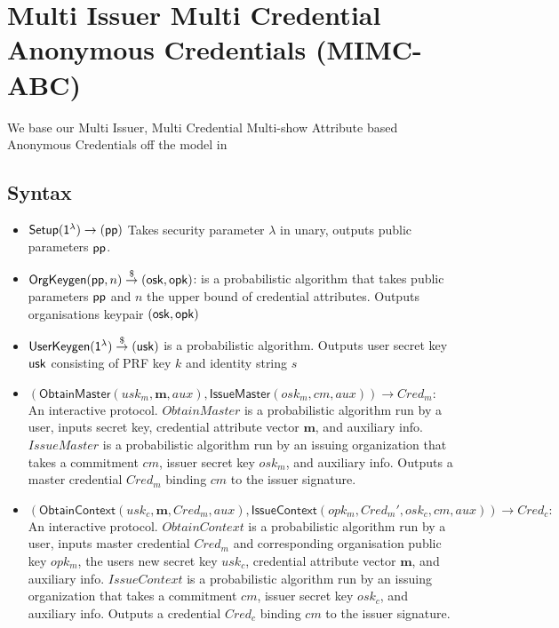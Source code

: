 \cleardoublepage
\section{Multi Issuer Multi Credential Anonymous Credentials (MIMC-ABC)}\label{sec:mimc}

We base our Multi Issuer, Multi Credential Multi-show Attribute based Anonymous Credentials off the model in \cite{fuchsbauer_structure-preserving_2019}


\subsection{Syntax}
\begin{itemize}
    \item $\mathsf{Setup}(\mathsf{1^{\lambda}}) \to (\mathsf{pp})$ Takes security parameter $\lambda$ in unary, outputs public parameters $\mathsf{pp}$.

    \item $\mathsf{OrgKeygen}(\mathsf{pp}, n) \stackrel{\$}{\to} (\mathsf{osk}, \mathsf{opk})$: is a probabilistic algorithm that takes public parameters $\mathsf{pp}$ and $n$ the upper bound of credential attributes. Outputs organisations keypair $(\mathsf{osk}, \mathsf{opk})$

    \item $\mathsf{UserKeygen}(\mathsf{1^{\lambda}}) \stackrel{\$}{\to} (\mathsf{usk})$ is a probabilistic algorithm. Outputs user secret key $\mathsf{usk}$ consisting of PRF key $k$ and identity string $s$

    \item $(\mathsf{Obtain Master}(usk_m, \textbf{m}, aux), \mathsf{IssueMaster}(osk_m, cm, aux)) \to Cred_m:$ An interactive protocol. $Obtain Master$ is a probabilistic algorithm run by a user, inputs secret key, credential attribute vector $\textbf{m}$, and auxiliary info. $Issue Master$ is a probabilistic algorithm run by an issuing organization that takes a commitment $cm$, issuer secret key $osk_m$, and auxiliary info. Outputs a master credential $Cred_m$ binding $cm$ to the issuer signature.
    
    \item $(\mathsf{Obtain Context}(usk_c, \textbf{m}, Cred_m, aux), \mathsf{Issue Context}(opk_m, Cred_m', osk_c, cm, aux)) \to Cred_c:$ An interactive protocol. $Obtain Context$ is a probabilistic algorithm run by a user, inputs master credential $Cred_m$ and corresponding organisation public key $opk_m$, the users new secret key $usk_c$, credential attribute vector $\textbf{m}$, and auxiliary info. $Issue Context$ is a probabilistic algorithm run by an issuing organization that takes a commitment $cm$, issuer secret key $osk_c$, and auxiliary info. Outputs a credential $Cred_c$ binding $cm$ to the issuer signature.


\end{itemize}
